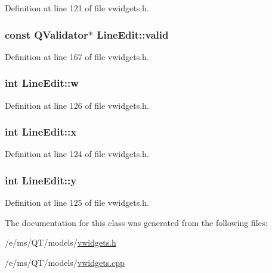 Definition at line 121 of file vwidgets.h.

\hypertarget{classLineEdit_a4d9da17a0bc8380fdb22c4b197431d0a}{
\subsubsection[{valid}]{\setlength{\rightskip}{0pt plus 5cm}const QValidator$\ast$ {\bf LineEdit::valid}}}
\label{classLineEdit_a4d9da17a0bc8380fdb22c4b197431d0a}


Definition at line 167 of file vwidgets.h.

\hypertarget{classLineEdit_a9ac1b912bc68696a166d681a5b86dbf2}{
\subsubsection[{w}]{\setlength{\rightskip}{0pt plus 5cm}int {\bf LineEdit::w}}}
\label{classLineEdit_a9ac1b912bc68696a166d681a5b86dbf2}


Definition at line 126 of file vwidgets.h.

\hypertarget{classLineEdit_a8a3d3eb982e8a27cc6bdbf3664330bb4}{
\subsubsection[{x}]{\setlength{\rightskip}{0pt plus 5cm}int {\bf LineEdit::x}}}
\label{classLineEdit_a8a3d3eb982e8a27cc6bdbf3664330bb4}


Definition at line 124 of file vwidgets.h.

\hypertarget{classLineEdit_aa6005ddcc5167be3d2d3d73e869dd434}{
\subsubsection[{y}]{\setlength{\rightskip}{0pt plus 5cm}int {\bf LineEdit::y}}}
\label{classLineEdit_aa6005ddcc5167be3d2d3d73e869dd434}


Definition at line 125 of file vwidgets.h.



The documentation for this class was generated from the following files:\begin{DoxyCompactItemize}
\item 
/e/ms/QT/models/\hyperlink{vwidgets_8h}{vwidgets.h}\item 
/e/ms/QT/models/\hyperlink{vwidgets_8cpp}{vwidgets.cpp}\end{DoxyCompactItemize}
